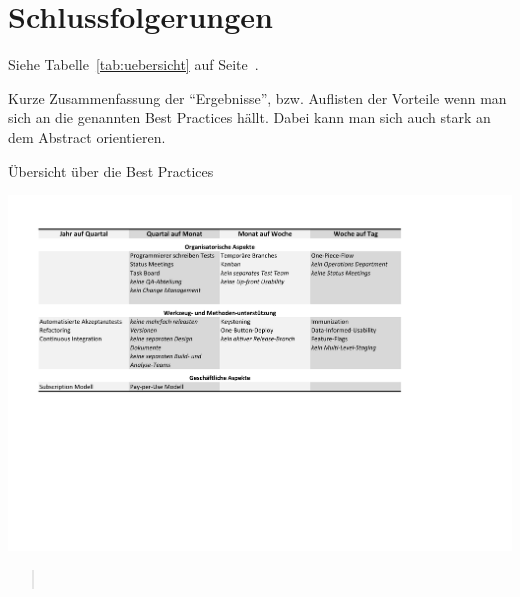 \section{Schlussfolgerungen}
\label{sec:schlussfolgerungen}

Siehe Tabelle~\ref{tab:uebersicht} auf Seite~\pageref{tab:uebersicht}.

\begin{wichtigbox}
Kurze Zusammenfassung der \enquote{Ergebnisse}, bzw. Auflisten der Vorteile
wenn man sich an die genannten Best Practices hällt. Dabei kann man sich auch
stark an dem Abstract orientieren.
\end{wichtigbox}

\begin{table}[htbp]
    \centering
        \caption{Übersicht über die Best Practices}
        \includegraphics[trim = 50bp 265bp 185bp 56bp, clip, width=1.00\textwidth]{uebersicht}
    \label{tab:uebersicht}
\end{table}


\begin{quote}
~\cite{digg4}
\end{quote}
